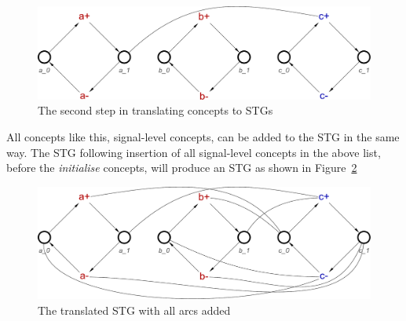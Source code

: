 \documentclass[british,compsoc]{IEEEtran}
\begin{document}
\begin{figure}[h]
\begin{centering}
\includegraphics[scale=0.23]{Images/Step-by-step2}
\par\end{centering}

\begin{centering}
\protect\caption{\label{fig:step-by-step2}The second step in translating concepts to STGs}

\par\end{centering}

\end{figure}

All concepts like this, signal-level concepts, can be added to the STG in the same way. The STG following insertion of all signal-level concepts in the above list, before the \emph{initialise} concepts, will produce an STG as
shown in Figure~\ref{fig:step-by-step9}

\begin{figure}[h]
\begin{centering}
\includegraphics[scale=0.23]{Images/Step-by-step9}
\par\end{centering}

\begin{centering}
\protect\caption{\label{fig:step-by-step9}The translated STG with all arcs added}

\par\end{centering}

\end{figure}
\end{document}
